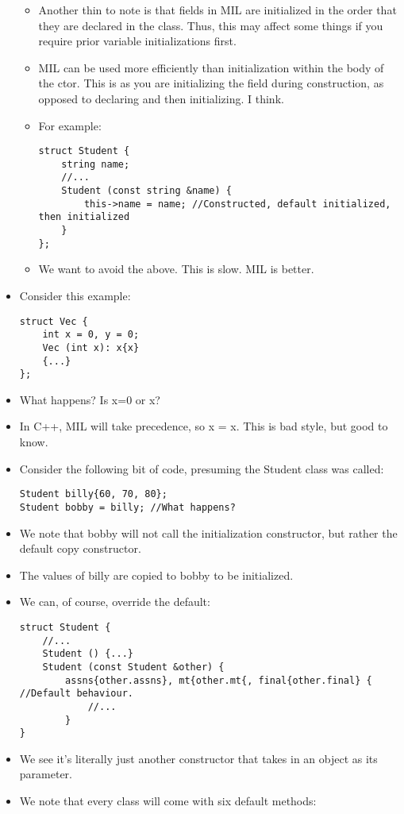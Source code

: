 \documentclass{article}
\begin{document}
\begin{itemize}
\begin{itemize}
\item Another thin to note is that fields in MIL are initialized in the order that they are declared in the class.  Thus, this may affect some things if you require prior variable initializations first.
\item MIL can be used more efficiently than initialization within the body of the ctor.  This is as you are initializing the field during construction, as opposed to declaring and then initializing.  I think.
\item For example:
\begin{lstlisting}
struct Student {
    string name;
    //...
    Student (const string &name) {
        this->name = name; //Constructed, default initialized, then initialized
    }
};
\end{lstlisting}
\item We want to avoid the above.  This is slow.  MIL is better. 
\end{itemize}
\item Consider this example:
\begin{lstlisting}
struct Vec {
    int x = 0, y = 0;
    Vec (int x): x{x}
    {...}
};
\end{lstlisting}
\item What happens?  Is x=0 or {x}?  
\item In C++, MIL will take precedence, so x = {x}.  This is bad style, but good to know.
\item Consider the following bit of code, presuming the Student class was called:
\begin{lstlisting}
Student billy{60, 70, 80};
Student bobby = billy; //What happens?
\end{lstlisting}
\item We note that bobby will not call the initialization constructor, but rather the default copy constructor.
\item The values of billy are copied to bobby to be initialized.
\item We can, of course, override the default:
\begin{lstlisting}
struct Student {
    //...
    Student () {...}
    Student (const Student &other) {
        assns{other.assns}, mt{other.mt{, final{other.final} { //Default behaviour.
            //...
        }
}
\end{lstlisting}
\item We see it's literally just another constructor that takes in an object as its parameter.
\item We note that every class will come with six default methods:

\end{itemize}
\end{document}
